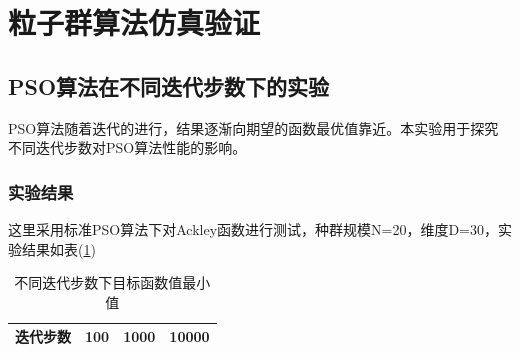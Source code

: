 \section{粒子群算法仿真验证}
\subsection{PSO算法在不同迭代步数下的实验}
PSO算法随着迭代的进行，结果逐渐向期望的函数最优值靠近。本实验用于探究不同迭代步数对PSO算法性能的影响。
\subsubsection{实验结果}
这里采用标准PSO算法下对Ackley函数进行测试，种群规模N=20，维度D=30，实验结果如表(\ref{tab1})
\renewcommand\arraystretch{0.9}
\begin{table}[htbp]
	\centering
	\caption{不同迭代步数下目标函数值最小值}
	\label{tab1}
	\begin{tabular}{crrr}
		\toprule[1.5pt]
		\textbf{迭代步数}  & \textbf{100}   & \textbf{1000}  & \textbf{10000} \\
		\midrule[1pt]


\end{tabular}
\end{table}
